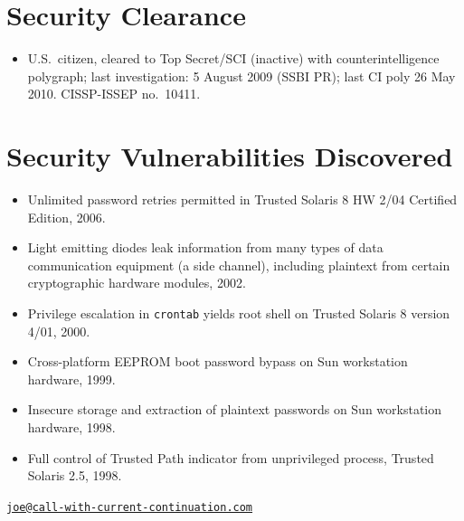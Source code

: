 \documentclass[12pt,twoside,letterpaper]{article}
\begin{document}
\vspace{-8mm}
\section*{Security Clearance}
\vspace{-2mm}

\begin{itemize}
	\item U.S.\ citizen, cleared to Top Secret/SCI (inactive) with counterintelligence
		polygraph; last investigation: 5 August 2009 (SSBI PR); last CI poly 26 May 2010.
		CISSP-ISSEP no.\ 10411.
\end{itemize}

\setlength{\fboxsep}{0pt}

\vspace{-8mm}
\section*{Security Vulnerabilities Discovered}
\vspace{-2mm}
\begin{itemize}
	\item Unlimited password retries permitted in Trusted Solaris 8 HW 2/04
		Certified Edition, 2006.\vspace{-2mm}
	\item Light emitting diodes leak information from many types of data
		communication equipment (a side channel), including plaintext from
		certain cryptographic hardware modules, 2002.\vspace{-1.5mm}
	\item Privilege escalation in \verb,crontab, yields root shell on Trusted
		Solaris 8 version 4/01, 2000.\vspace{-2mm}
	\item Cross-platform EEPROM boot password bypass on Sun workstation
		hardware, 1999.\vspace{-2mm}
	\item Insecure storage and extraction of plaintext passwords on Sun workstation
		hardware, 1998.\vspace{-2mm}
	\item Full control of Trusted Path indicator from unprivileged process,
		Trusted Solaris 2.5, 1998.\vspace{-2mm}
\end{itemize}

\newpage


\vspace*{-18mm}\hfill\href{mailto:joe@call-with-current-continuation.com}%
{\nolinkurl{joe@call-with-current-continuation.com}}
\end{document}
